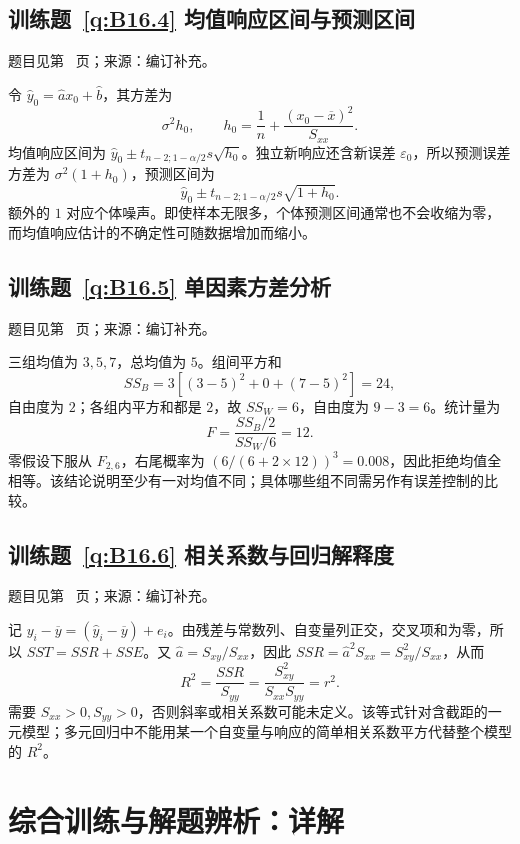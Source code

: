 \documentclass[UTF8,12pt,a4paper,fontset=fandol]{ctexbook}
\begin{document}
\subsection*{训练题~\ref{q:B16.4} 均值响应区间与预测区间}\label{a:B16.4}{\small 题目见第~\pageref{q:B16.4} 页；来源：编订补充。}
\begin{solve}令 $\widehat y_0=\widehat a x_0+\widehat b$，其方差为\[\sigma^2h_0,\qquad h_0=\frac1n+\frac{(x_0-\overline x)^2}{S_{xx}}.\]均值响应区间为 $\widehat y_0\pm t_{n-2;1-\alpha/2}s\sqrt{h_0}$。独立新响应还含新误差 $\varepsilon_0$，所以预测误差方差为 $\sigma^2(1+h_0)$，预测区间为\[\widehat y_0\pm t_{n-2;1-\alpha/2}s\sqrt{1+h_0}.\]额外的 $1$ 对应个体噪声。即使样本无限多，个体预测区间通常也不会收缩为零，而均值响应估计的不确定性可随数据增加而缩小。\end{solve}

\subsection*{训练题~\ref{q:B16.5} 单因素方差分析}\label{a:B16.5}{\small 题目见第~\pageref{q:B16.5} 页；来源：编订补充。}
\begin{solve}三组均值为 $3,5,7$，总均值为 $5$。组间平方和\[SS_B=3[(3-5)^2+0+(7-5)^2]=24,\]自由度为 $2$；各组内平方和都是 $2$，故 $SS_W=6$，自由度为 $9-3=6$。统计量为\[F=\frac{SS_B/2}{SS_W/6}=12.\]零假设下服从 $F_{2,6}$，右尾概率为 $(6/(6+2\times12))^3=0.008$，因此拒绝均值全相等。该结论说明至少有一对均值不同；具体哪些组不同需另作有误差控制的比较。\end{solve}

\subsection*{训练题~\ref{q:B16.6} 相关系数与回归解释度}\label{a:B16.6}{\small 题目见第~\pageref{q:B16.6} 页；来源：编订补充。}
\begin{solve}记 $y_i-\overline y=(\widehat y_i-\overline y)+e_i$。由残差与常数列、自变量列正交，交叉项和为零，所以 $SST=SSR+SSE$。又 $\widehat a=S_{xy}/S_{xx}$，因此 $SSR=\widehat a^2S_{xx}=S_{xy}^2/S_{xx}$，从而\[R^2=\frac{SSR}{S_{yy}}=\frac{S_{xy}^2}{S_{xx}S_{yy}}=r^2.\]需要 $S_{xx}>0,S_{yy}>0$，否则斜率或相关系数可能未定义。该等式针对含截距的一元模型；多元回归中不能用某一个自变量与响应的简单相关系数平方代替整个模型的 $R^2$。\end{solve}

\clearpage\section*{综合训练与解题辨析：详解}
\end{document}
